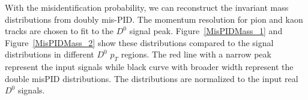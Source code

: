 With the misidentification probability, we can reconstruct the invariant mass distributions from doubly mis-PID. The momentum resolution for pion and kaon tracks are chosen to fit to the $D^{0}$ signal peak. Figure~\ref{MisPIDMass_1} and Figure~\ref{MisPIDMass_2} show these distributions compared to the signal distributions in different $D^0$ $p_{T}$ regions. The red line with a narrow peak represent the input signals while black curve with broader width represent the double misPID distributions. The distributions are normalized to the input real $D^{0}$ signals.

\begin{figure}
\end{figure}

